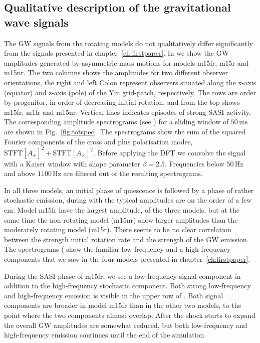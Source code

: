 \subsection{Qualitative description of the gravitational wave signals}
The GW signals from the rotating models do not qualitatively differ significantly from
the signals presented in chapter~\ref{ch:firstpaper}. In  we show the
GW amplitudes generated by asymmetric mass motions for models m15fr, m15r and m15nr.
The two columns shows the amplitudes for two different observer orientations,
the right and left Colon represent observers situated along the x-axis (equator) and z-axis (pole) of the Yin grid-patch,
respectively. The rows are order by progenitor, in order of decreasing initial rotation, and from the top
shows m15fr, m1fr and m15nr. Vertical lines indicates episodes of strong SASI activity.
The corresponding amplitude spectrograms (see ) for a sliding window of $50 \, \mathrm{ms}$ are shown 
in Fig.~\ref{fig:totspec}. The spectrograms show the sum of the squared Fourier
components of the cross and plus polarisation modes,
$\text{STFT}[{A_+}]^2 + \text{STFT}[{A_{\times}}]^2$. Before applying the
DFT we convolve the signal with a Kaiser window with shape parameter $\beta = 2.5$. Frequencies
below $50 \, \mathrm{Hz}$ and above $1100  \, \mathrm{Hz}$ are filtered out of the resulting spectrograms. 

In all three models, an initial phase of quiescence is followed by a phase of rather stochastic emission, 
during with the typical amplitudes are on the order of a few cm. Model m15fr have the largest amplitude, of the three
models, but at the same time the non-rotating model (m15nr) show larger amplitudes than the moderately rotating model (m15r).
There seems to be no clear correlation between the strength initial rotation rate and the strength of the GW emission. 
The spectrograms ( show the familiar low-frequency and a high-frequency components that we saw in the
four models presented in chapter~\ref{ch:firstpaper}.

During the SASI phase of m15fr, we see a low-frequency signal component in addition 
to the high-frequency stochastic component. Both strong low-frequency and high-frequency
emission is visible in the upper row of . Both signal components
are broader in model m15fr than in the other two models, to the point where the two components almost
overlap. After the shock starts to expand the overall GW amplitudes are somewhat reduced, but
both low-frequency and high-frequency emission continues until the end of the simulation.

